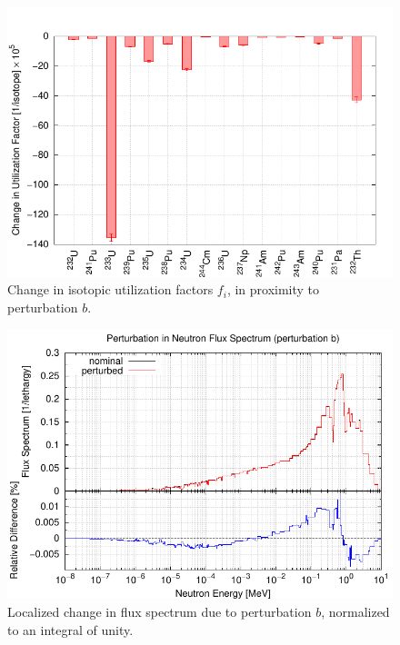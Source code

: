 \documentclass[11pt]{article}
\begin{document}
\clearpage
\begin{figure}[p]
  \centering
  \includegraphics[width=\textwidth, trim=0 0 0 0.275in, clip]{./img/Th-b-IsotopeDeltaEff.pdf}
  \caption{Change in isotopic utilization factors $f_i$, in proximity to perturbation $b$.}
  \label{fig:deltaEffI}
\end{figure}

\clearpage
\begin{figure}[p]
  \centering
  \includegraphics[width=\textwidth, trim=0 0 0 0.2in, clip]{./img/Th-b-SpectraFlux.pdf}
  \caption{Localized change in flux spectrum due to perturbation $b$, normalized to an integral of unity.}
  \label{fig:deltaFlx}
\end{figure}
\end{document}
